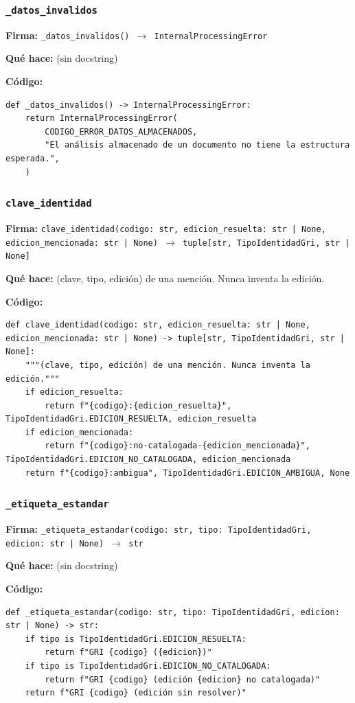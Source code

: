 \documentclass[11pt,a4paper]{article}
\begin{document}
\subsubsection*{\texttt{\_datos\_invalidos}}
\textbf{Firma:} \texttt{\_datos\_invalidos() $\rightarrow$ InternalProcessingError}

\textbf{Qué hace:} (sin docstring)

\textbf{Código:}
\begin{lstlisting}
def _datos_invalidos() -> InternalProcessingError:
    return InternalProcessingError(
        CODIGO_ERROR_DATOS_ALMACENADOS,
        "El análisis almacenado de un documento no tiene la estructura esperada.",
    )
\end{lstlisting}

\subsubsection*{\texttt{clave\_identidad}}
\textbf{Firma:} \texttt{clave\_identidad(codigo: str, edicion\_resuelta: str | None, edicion\_mencionada: str | None) $\rightarrow$ tuple[str, TipoIdentidadGri, str | None]}

\textbf{Qué hace:} (clave, tipo, edición) de una mención. Nunca inventa la edición.

\textbf{Código:}
\begin{lstlisting}
def clave_identidad(codigo: str, edicion_resuelta: str | None, edicion_mencionada: str | None) -> tuple[str, TipoIdentidadGri, str | None]:
    """(clave, tipo, edición) de una mención. Nunca inventa la edición."""
    if edicion_resuelta:
        return f"{codigo}:{edicion_resuelta}", TipoIdentidadGri.EDICION_RESUELTA, edicion_resuelta
    if edicion_mencionada:
        return f"{codigo}:no-catalogada-{edicion_mencionada}", TipoIdentidadGri.EDICION_NO_CATALOGADA, edicion_mencionada
    return f"{codigo}:ambigua", TipoIdentidadGri.EDICION_AMBIGUA, None
\end{lstlisting}

\subsubsection*{\texttt{\_etiqueta\_estandar}}
\textbf{Firma:} \texttt{\_etiqueta\_estandar(codigo: str, tipo: TipoIdentidadGri, edicion: str | None) $\rightarrow$ str}

\textbf{Qué hace:} (sin docstring)

\textbf{Código:}
\begin{lstlisting}
def _etiqueta_estandar(codigo: str, tipo: TipoIdentidadGri, edicion: str | None) -> str:
    if tipo is TipoIdentidadGri.EDICION_RESUELTA:
        return f"GRI {codigo} ({edicion})"
    if tipo is TipoIdentidadGri.EDICION_NO_CATALOGADA:
        return f"GRI {codigo} (edición {edicion} no catalogada)"
    return f"GRI {codigo} (edición sin resolver)"
\end{lstlisting}
\end{document}

